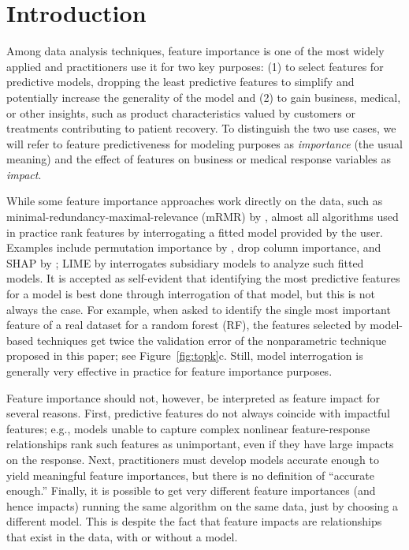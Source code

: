 \documentclass[smallextended]{svjour3}       %
\newcommand{\figref}[1]{Figure~\ref{#1}}
\begin{document}

\section{Introduction}
\label{sec:intro}

Among data analysis techniques, feature importance is one of the most widely applied and practitioners use it for two key purposes: (1) to select features for predictive models, dropping the least predictive features to simplify and potentially increase the generality of the model and (2) to gain business, medical, or other insights, such as product characteristics valued by customers or treatments contributing to patient recovery.  To distinguish the two use cases, we will refer to feature predictiveness for modeling purposes as {\em importance} (the usual meaning) and the effect of features on business or medical response variables as {\em impact}. 

While some feature importance approaches work directly on the data, such as minimal-redundancy-maximal-relevance (mRMR) by \cite{mRMR}, almost all algorithms used in practice rank features by interrogating a fitted model provided by the user.  Examples include permutation importance by \cite{RF}, drop column importance, and SHAP by \cite{shap}; LIME by \cite{lime} interrogates subsidiary models to analyze such fitted models. It is accepted as self-evident that identifying the most predictive features for a model is best done through interrogation of that  model, but this is not always the case.  For example, when asked to identify the single most important feature of a real dataset \citep{bulldozer} for a random forest (RF), the features selected by model-based techniques get twice the validation error of the nonparametric technique proposed in this paper; see \figref{fig:topk}c. Still, model interrogation is generally very effective in practice for feature importance purposes.

Feature importance should not, however, be interpreted as feature impact for several reasons. First, predictive features do not always coincide with impactful features; e.g., models unable to capture complex nonlinear feature-response relationships rank such features as unimportant, even if they have large impacts on the response. Next, practitioners must develop models accurate enough to yield meaningful feature importances, but there is no definition of ``accurate enough.'' Finally, it is possible to get very different feature importances (and hence impacts) running the same algorithm on the same data, just by choosing a different model. This is despite the fact that feature impacts are relationships that exist in the data, with or without a model.
\end{document}

